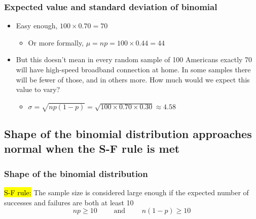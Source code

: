 \documentclass[slidestop,compress,mathserif,12pt,t,professionalfonts,xcolor=table]{beamer}
\begin{document}
\begin{frame}
\frametitle{Expected value and standard deviation of binomial}


\pause

\begin{itemize}

\item Easy enough, $100 \times 0.70 = 70$
\pause
\begin{itemize}
\item Or more formally, $\mu = np = 100 \times 0.44 = 44$
\end{itemize}

\pause

\item But this doesn't mean in every random sample of 100 Americans exactly 70 will have high-speed broadband connection at home. In some samples there will be fewer of those, and in others more. How much would we expect this value to vary?
\pause
\begin{itemize}
\item $\sigma = \sqrt{np(1-p)} = \sqrt{100 \times 0.70 \times 0.30} \approx  4.58$
\end{itemize}

\end{itemize}


\end{frame}


\subsection{Shape of the binomial distribution approaches normal when the S-F rule is met}
\label{mi3}


\begin{frame}
\frametitle{Shape of the binomial distribution}

\vfill

\begin{center}
\end{center}
\vfill

\pause
\hl{S-F rule:} The sample size is considered large enough if the expected number of successes and failures are both at least 10
\[ np \ge 10 \qquad \text{ and } \qquad n(1-p) \ge 10 \]

\end{frame}
\end{document}
